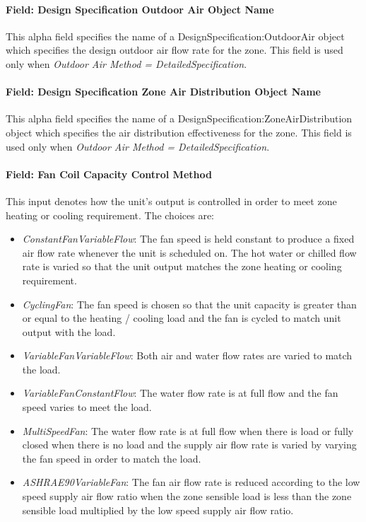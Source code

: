 \paragraph{Field: Design Specification Outdoor Air Object Name}\label{field-design-specification-outdoor-air-object-name-2-000}

This alpha field specifies the name of a DesignSpecification:OutdoorAir object which specifies the design outdoor air flow rate for the zone. This field is used only when \emph{Outdoor Air Method = DetailedSpecification}.

\paragraph{Field: Design Specification Zone Air Distribution Object Name}\label{field-design-specification-zone-air-distribution-object-name-1}

This alpha field specifies the name of a DesignSpecification:ZoneAirDistribution object which specifies the air distribution effectiveness for the zone. This field is used only when \emph{Outdoor Air Method = DetailedSpecification}.

\paragraph{Field: Fan Coil Capacity Control Method}\label{field-fan-coil-capacity-control-method}

This input denotes how the unit's output is controlled in order to meet zone heating or cooling requirement. The choices are:
\begin{itemize}
\item
  \emph{ConstantFanVariableFlow}: The fan speed is held constant to produce a fixed air flow rate whenever the unit is scheduled on. The hot water or chilled flow rate is varied so that the unit output matches the zone heating or cooling requirement. 
\item
  \emph{CyclingFan}: The fan speed is chosen so that the unit capacity is greater than or equal to the heating / cooling load and the fan is cycled to match unit output with the load.
\item
  \emph{VariableFanVariableFlow}: Both air and water flow rates are varied to match the load.
\item
  \emph{VariableFanConstantFlow}: The water flow rate is at full flow and the fan speed varies to meet the load.
\item
  \emph{MultiSpeedFan}: The water flow rate is at full flow when there is load or fully closed when there is no load and the supply air flow rate is varied by varying the fan speed in order to match the load.
\item
  \emph{ASHRAE90VariableFan}: The fan air flow rate is reduced according to the low speed supply air flow ratio when the zone sensible load is less than the zone sensible load multiplied by the low speed supply air flow ratio. 
\end{itemize}
  
